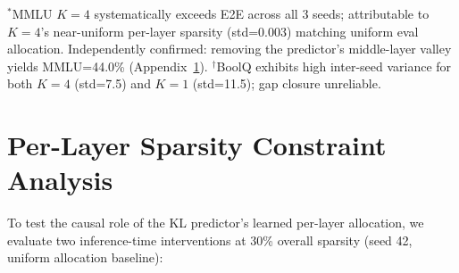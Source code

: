 \begin{table}[h]
\centering
\caption{3-seed $K{=}4$ mismatch control at 30\% sparsity (LLaMA-3.1-8B, uniform allocation, $s \in \{42, 123, 456\}$). Actual sparsity 29.6\%; per-layer sparsity std=0.003 (near-uniform). Gap closure $= (K{=}4 - K{=}1) / (\text{E2E} - K{=}1) \times 100$.}
\label{tab:k4_downstream}
\vspace{2pt}
{\footnotesize $^\ast$MMLU $K{=}4$ systematically exceeds E2E across all 3 seeds; attributable to $K{=}4$'s near-uniform per-layer sparsity (std=0.003) matching uniform eval allocation. Independently confirmed: removing the predictor's middle-layer valley yields MMLU=44.0\% (Appendix~\ref{app:constraint}).
$^\dagger$BoolQ exhibits high inter-seed variance for both $K{=}4$ (std=7.5) and $K{=}1$ (std=11.5); gap closure unreliable.}
\end{table}

\section{Per-Layer Sparsity Constraint Analysis}
\label{app:constraint}

To test the causal role of the KL predictor's learned per-layer allocation, we evaluate two inference-time interventions at 30\% overall sparsity (seed 42, uniform allocation baseline):

\begin{table}[h]
\centering
\caption{Per-layer sparsity constraint analysis. \emph{Protect late}: cap L22--L28 sparsity $\leq$30\%; \emph{Remove valley}: override L14--L18 sparsity to 30\%. Budget redistributed to maintain 30\% overall.}
\label{tab:constraint}
\end{table}


